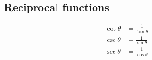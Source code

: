 \subsection*{Reciprocal functions}

\begin{align*}
  \cot \theta &= \frac{1}{\tan \theta}\\
  \csc \theta &= \frac{1}{\sin \theta}\\
  \sec \theta &= \frac{1}{\cos \theta}
\end{align*}